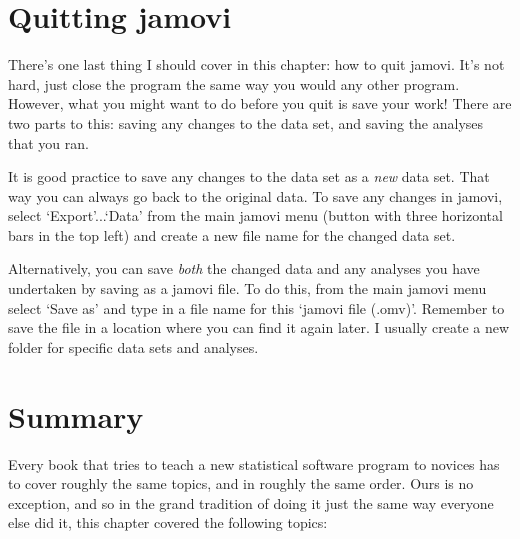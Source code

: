 \section{Quitting jamovi \label{sec:quittingjamovi}}

There's one last thing I should cover in this chapter: how to quit jamovi. It's not hard, just close the program the same way you would any other program. However, what you might want to do before you quit is save your work! There are two parts to this: saving any changes to the data set, and saving the analyses that you ran.

It is good practice to save any changes to the data set as a {\it new} data set. That way you can always go back to the original data. To save any changes in jamovi, select `Export'...`Data' from the main jamovi menu (button with three horizontal bars in the top left) and create a new file name for the changed data set.

Alternatively, you can save {\it both} the changed data and any analyses you have undertaken by saving as a jamovi file. To do this, from the main jamovi menu select `Save as' and type in a file name for this `jamovi file (.omv)'. Remember to save the file in a location where you can find it again later. I usually create a new folder for specific data sets and analyses.  


\section{Summary}

Every book that tries to teach a new statistical software program to novices has to cover roughly the same topics, and in roughly the same order. Ours is no exception, and so in the grand tradition of doing it just the same way everyone else did it, this chapter covered the following topics:

